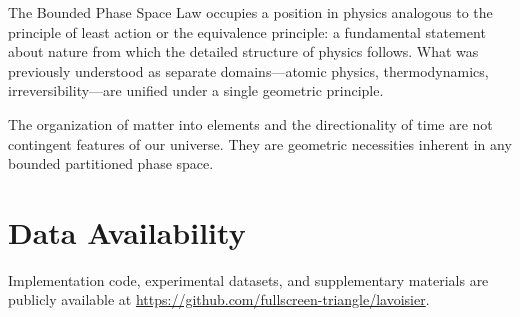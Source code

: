 \documentclass[twocolumn,10pt,a4paper]{article}
\theoremstyle{definition}
\theoremstyle{remark}
\begin{document}
The Bounded Phase Space Law occupies a position in physics analogous to the principle of least action or the equivalence principle: a fundamental statement about nature from which the detailed structure of physics follows. What was previously understood as separate domains---atomic physics, thermodynamics, irreversibility---are unified under a single geometric principle.

The organization of matter into elements and the directionality of time are not contingent features of our universe. They are geometric necessities inherent in any bounded partitioned phase space.

\section*{Data Availability}

Implementation code, experimental datasets, and supplementary materials are publicly available at \url{https://github.com/fullscreen-triangle/lavoisier}.



\end{document}
